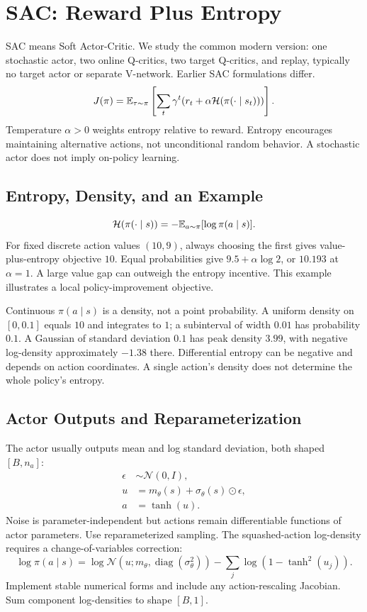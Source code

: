 \section{SAC: Reward Plus Entropy}
SAC means Soft Actor-Critic. We study the common modern version:
one stochastic actor, two online Q-critics, two target Q-critics,
and replay, typically no target actor or separate V-network.
Earlier SAC formulations differ.
\begin{equation}
J(\pi)=\mathbb{E}_{\tau\sim\pi}\left[
\sum_t\gamma^t(r_t+\alpha\mathcal H(\pi(\cdot\mid s_t)))\right].
\end{equation}
Temperature $\alpha>0$ weights entropy relative to reward.
Entropy encourages maintaining alternative actions, not unconditional
random behavior. A stochastic actor does not imply on-policy learning.

\subsection{Entropy, Density, and an Example}
\begin{equation}
\mathcal H(\pi(\cdot\mid s))=-\mathbb{E}_{a\sim\pi}[\log\pi(a\mid s)].
\end{equation}
For fixed discrete action values $(10,9)$, always choosing the first
gives value-plus-entropy objective $10$. Equal probabilities give
$9.5+\alpha\log2$, or $10.193$ at $\alpha=1$.
A large value gap can outweigh the entropy incentive.
This example illustrates a local policy-improvement objective.

Continuous $\pi(a\mid s)$ is a density, not a point probability.
A uniform density on $[0,0.1]$ equals $10$ and integrates to $1$;
a subinterval of width $0.01$ has probability $0.1$.
A Gaussian of standard deviation $0.1$ has peak density $3.99$,
with negative log-density approximately $-1.38$ there.
Differential entropy can be negative and depends on action coordinates.
A single action's density does not determine the whole policy's entropy.

\subsection{Actor Outputs and Reparameterization}
The actor usually outputs mean and log standard deviation,
both shaped $[B,n_a]$:
\begin{align}
\epsilon&\sim\mathcal N(0,I),\\
u&=m_\theta(s)+\sigma_\theta(s)\odot\epsilon,\\
a&=\tanh(u).
\end{align}
Noise is parameter-independent but actions remain differentiable
functions of actor parameters. Use reparameterized sampling.
The squashed-action log-density requires a change-of-variables correction:
\begin{equation}
\log\pi(a\mid s)=
\log\mathcal N(u;m_\theta,\operatorname{diag}(\sigma_\theta^2))
-\sum_j\log(1-\tanh^2(u_j)).
\end{equation}
Implement stable numerical forms and include any action-rescaling
Jacobian. Sum component log-densities to shape $[B,1]$.

